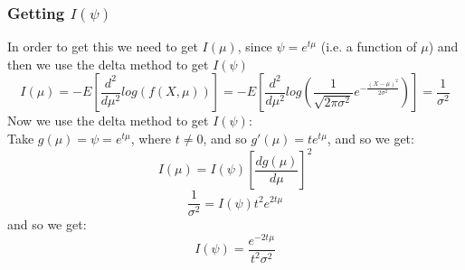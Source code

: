 \documentclass[12pt]{article}
\begin{document}
\subsubsection*{Getting $I(\psi)$}
In order to get this we need to get $I(\mu)$, since $\psi= e^{t\mu}$ (i.e. a function of $\mu$) and then we use the delta method to get $I(\psi)$\\
\[
  I(\mu) = -E[\frac{d^2}{d\mu^2}log(f(X,\mu))] = -E[\frac{d^2}{d\mu^2}log(\frac{1}{\sqrt{2\pi\sigma^2}}e^{-\frac{(X-\mu)^2}{2\sigma^2}})] = \frac{1}{\sigma^2}
\]
Now we use the delta method to get $I(\psi)$:\\
Take $g(\mu) = \psi = e^{t\mu}$, where $t \neq 0$, and so $g'(\mu) = te^{t\mu}$, and so we get:
\[
I(\mu) = I(\psi)[\frac{dg(\mu)}{d\mu}]^2
\]
\[
\frac{1}{\sigma^2} = I(\psi)t^2e^{2t\mu}
\]
and so we get: 
\[
I(\psi) = \frac{e^{-2t\mu}}{t^2\sigma^2}
\]
\end{document}
